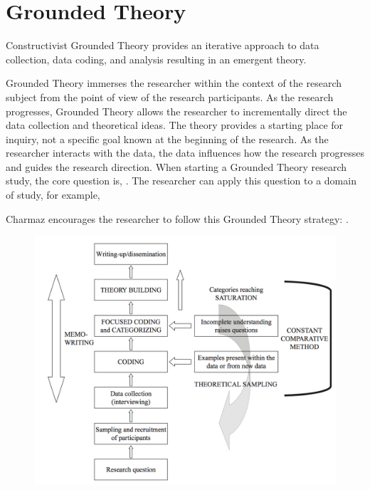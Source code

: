 
\chapter{Grounded Theory}
\label{ConstructivistGroundedTheoryChapter}
Constructivist Grounded Theory \cite{Charmaz} provides an iterative approach to data collection, data coding, and analysis resulting in an emergent theory. 

Grounded Theory immerses the researcher within the context of the research subject from the point of view of the research participants. As the research progresses, Grounded Theory allows the researcher to incrementally direct the data collection and theoretical ideas. The theory provides a starting place for inquiry, not a specific goal known at the beginning of the research. As the researcher interacts with the data, the data influences how the research progresses and guides the research direction. When starting a Grounded Theory research study, the core question is,  \cite{GlaserTheoreticalSensitivity}. The researcher can apply this question to a domain of study, for example, 

Charmaz encourages the researcher to follow this Grounded Theory strategy:  \cite{Charmaz}.

\begin{figure}[t]
\centering
{}
\includegraphics[width=6.4in]{grounded_theory_images/tweed_grounded_theory.png}
\end{figure}

